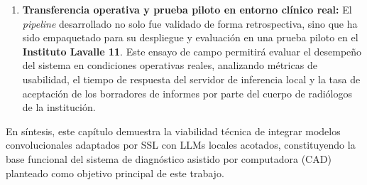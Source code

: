\documentclass[../main.tex]{subfiles}
\begin{document}
\begin{enumerate}
    \item \textbf{Transferencia operativa y prueba piloto en entorno clínico real:} El \textit{pipeline} desarrollado no solo fue validado de forma retrospectiva, sino que ha sido empaquetado para su despliegue y evaluación en una prueba piloto en el \textbf{Instituto Lavalle 11}. Este ensayo de campo permitirá evaluar el desempeño del sistema en condiciones operativas reales, analizando métricas de usabilidad, el tiempo de respuesta del servidor de inferencia local y la tasa de aceptación de los borradores de informes por parte del cuerpo de radiólogos de la institución.
\end{enumerate}

En síntesis, este capítulo demuestra la viabilidad técnica de integrar modelos convolucionales adaptados por SSL con LLMs locales acotados, constituyendo la base funcional del sistema de diagnóstico asistido por computadora (CAD) planteado como objetivo principal de este trabajo.
\end{document}
